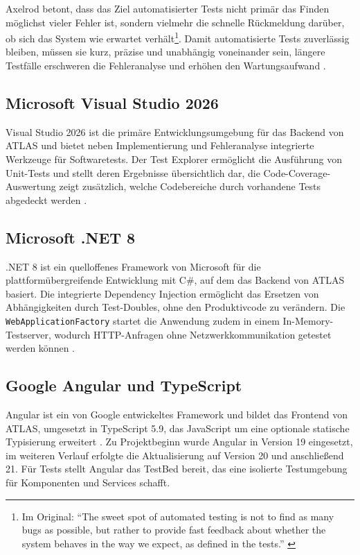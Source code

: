 Axelrod betont, dass das Ziel automatisierter Tests nicht primär das Finden möglichst vieler Fehler ist, sondern vielmehr die schnelle Rückmeldung darüber, ob sich das System wie erwartet verhält\footnote{Im Original: \enquote{The sweet spot of automated testing is not to find as many bugs as possible, but rather to provide fast feedback about whether the system behaves in the way we expect, as defined in the tests.} \cite[S.~19]{Axelrod2018}}. Damit automatisierte Tests zuverlässig bleiben, müssen sie kurz, präzise und unabhängig voneinander sein, längere Testfälle erschweren die Fehleranalyse und erhöhen den Wartungsaufwand \cite[S.~25--26]{Axelrod2018}.

\subsection{Microsoft Visual Studio 2026}
Visual Studio 2026 ist die primäre Entwicklungsumgebung für das Backend von \ac{ATLAS} und bietet neben Implementierung und Fehleranalyse integrierte Werkzeuge für Softwaretests. Der Test Explorer ermöglicht die Ausführung von Unit-Tests und stellt deren Ergebnisse übersichtlich dar, die Code-Coverage-Auswertung zeigt zusätzlich, welche Codebereiche durch vorhandene Tests abgedeckt werden \cite{MicrosoftTestExplorerBasics2026,MicrosoftTestingToolsOverview2026}.

\subsection{Microsoft .NET 8}
.NET 8 ist ein quelloffenes Framework von Microsoft für die plattformübergreifende Entwicklung mit C\#, auf dem das Backend von \ac{ATLAS} basiert. Die integrierte Dependency Injection ermöglicht das Ersetzen von Abhängigkeiten durch Test-Doubles, ohne den Produktivcode zu verändern. Die \texttt{WebApplicationFactory} startet die Anwendung zudem in einem In-Memory-Testserver, wodurch HTTP-Anfragen ohne Netzwerkkommunikation getestet werden können \cite{MicrosoftTestingASPNETCore2026,MicrosoftTestASPNETCoreMVC2026,MicrosoftUnitTestingBestPractices2026}.

\subsection{Google Angular und TypeScript}
Angular ist ein von Google entwickeltes Framework und bildet das Frontend von \ac{ATLAS}, umgesetzt in TypeScript 5.9, das JavaScript um eine optionale statische Typisierung erweitert \cite{MicrosoftTypeScript2026}. Zu Projektbeginn wurde Angular in Version 19 eingesetzt, im weiteren Verlauf erfolgte die Aktualisierung auf Version 20 und anschließend 21. Für Tests stellt Angular das TestBed bereit, das eine isolierte Testumgebung für Komponenten und Services schafft.

